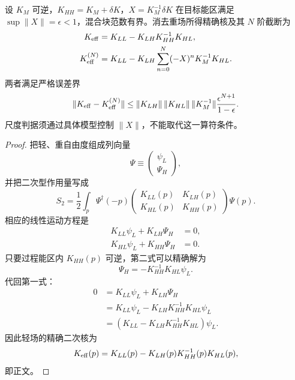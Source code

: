 \begin{proposition}
设 $K_M$ 可逆，$K_{HH}=K_M+\delta K$，$X=K_M^{-1}\delta K$ 在目标能区满足 $\sup\|X\|=\epsilon<1$，混合块范数有界。消去重场所得精确核及其 $N$ 阶截断为
\begin{align*}
K_{\rm eff}&=K_{LL}-K_{LH}K_{HH}^{-1}K_{HL},\\
K_{\rm eff}^{(N)}&=K_{LL}-K_{LH}\sum_{n=0}^N(-X)^nK_M^{-1}K_{HL}.
\end{align*}
两者满足严格误差界
\[
\|K_{\rm eff}-K_{\rm eff}^{(N)}\|
\le\|K_{LH}\|\,\|K_{HL}\|\,\|K_M^{-1}\|
\frac{\epsilon^{N+1}}{1-\epsilon}.
\]
尺度判据须通过具体模型控制 $\|X\|$，不能取代这一算符条件。
\end{proposition}
\begin{proof}
把轻、重自由度组成列向量
\begin{equation*}
 \Psi\equiv
 \begin{pmatrix}
  \psi_L\\ \Psi_H
 \end{pmatrix},
\end{equation*}
并把二次型作用量写成
\begin{equation*}
 S_2
 =\frac12\int_p
 \Psi^\dagger(-p)
 \begin{pmatrix}
 K_{LL}(p)&K_{LH}(p)\\
 K_{HL}(p)&K_{HH}(p)
 \end{pmatrix}
 \Psi(p).
\end{equation*}
相应的线性运动方程是
\begin{align*}
 K_{LL}\psi_L+K_{LH}\Psi_H&=0,\\
 K_{HL}\psi_L+K_{HH}\Psi_H&=0.
\end{align*}
只要过程能区内 $K_{HH}(p)$ 可逆，第二式可以精确解为
\begin{equation*}
 \Psi_H=-K_{HH}^{-1}K_{HL}\psi_L.
\end{equation*}
代回第一式：
\begin{align*}
 0
 &=K_{LL}\psi_L+K_{LH}\Psi_H\\
 &=K_{LL}\psi_L
 -K_{LH}K_{HH}^{-1}K_{HL}\psi_L\\
 &=\left(K_{LL}-K_{LH}K_{HH}^{-1}K_{HL}\right)\psi_L.
\end{align*}
因此轻场的精确二次核为
\begin{equation*}
 K_{\rm eff}(p)
 =K_{LL}(p)-K_{LH}(p)K_{HH}^{-1}(p)K_{HL}(p),
\end{equation*}
即正文。


\end{proof}
